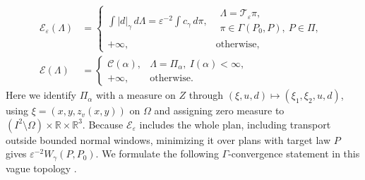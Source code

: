 \[
\begin{aligned}
\mathcal E_\varepsilon(\Lambda)
&=\begin{cases}
\displaystyle\int |d|_\gamma\,d\Lambda
=\varepsilon^{-2}\int c_\gamma\,d\pi,
&\begin{gathered}\Lambda=\mathscr T_\varepsilon\pi,\\ \pi\in\Gamma(P_0,P),\ P\in\Pi,\end{gathered}\\
+\infty,&\text{otherwise},
\end{cases}\\
\mathcal E(\Lambda)
&=\begin{cases}
\mathcal C(\alpha),&\Lambda=\Pi_\alpha,\ I(\alpha)<\infty,\\
+\infty,&\text{otherwise}.
\end{cases}
\end{aligned}
\]
Here we identify \(\Pi_\alpha\) with a measure on \(Z\) through \((\xi,u,d)\mapsto(\xi_1,\xi_2,u,d)\), using \(\xi=(x,y,z_v(x,y))\) on \(\Omega\) and assigning zero measure to \((I^2\setminus\Omega)\times\mathbb R\times\mathbb R^3\). Because \(\mathcal E_\varepsilon\) includes the whole plan, including transport outside bounded normal windows, minimizing it over plans with target law \(P\) gives \(\varepsilon^{-2}W_\gamma(P,P_0)\). We formulate the following \(\Gamma\)-convergence statement in this vague topology \cite{dalmaso1993}.

